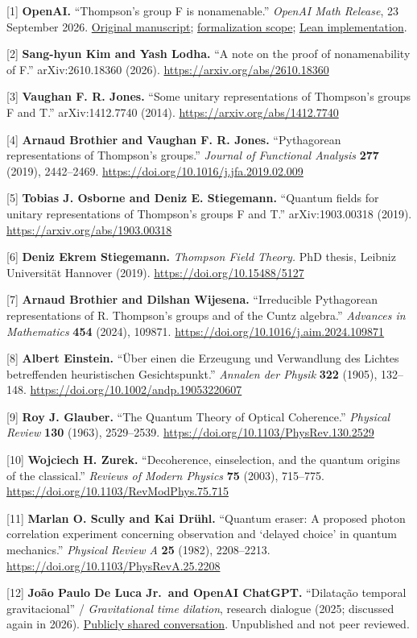 \documentclass[11pt,a4paper]{article}
\begin{document}
{[}1{]} \textbf{OpenAI.} ``Thompson's group F is nonamenable.'' \emph{OpenAI Math Release}, 23 September 2026. \href{https://github.com/openai/math/blob/main/preprints/Thompsons-group-F-is-nonamenable-September-23-2026/paper.pdf}{Original manuscript}; \href{https://github.com/openai/math/blob/main/lean/docs/248.md}{formalization scope}; \href{https://github.com/openai/math/blob/main/lean/OAI/GroupTheory/Thompson/Main.lean}{Lean implementation}.

{[}2{]} \textbf{Sang-hyun Kim and Yash Lodha.} ``A note on the proof of nonamenability of F.'' arXiv:2610.18360 (2026). \url{https://arxiv.org/abs/2610.18360}

{[}3{]} \textbf{Vaughan F. R. Jones.} ``Some unitary representations of Thompson's groups F and T.'' arXiv:1412.7740 (2014). \url{https://arxiv.org/abs/1412.7740}

{[}4{]} \textbf{Arnaud Brothier and Vaughan F. R. Jones.} ``Pythagorean representations of Thompson's groups.'' \emph{Journal of Functional Analysis} \textbf{277} (2019), 2442--2469. \url{https://doi.org/10.1016/j.jfa.2019.02.009}

{[}5{]} \textbf{Tobias J. Osborne and Deniz E. Stiegemann.} ``Quantum fields for unitary representations of Thompson's groups F and T.'' arXiv:1903.00318 (2019). \url{https://arxiv.org/abs/1903.00318}

{[}6{]} \textbf{Deniz Ekrem Stiegemann.} \emph{Thompson Field Theory.} PhD thesis, Leibniz Universität Hannover (2019). \url{https://doi.org/10.15488/5127}

{[}7{]} \textbf{Arnaud Brothier and Dilshan Wijesena.} ``Irreducible Pythagorean representations of R. Thompson's groups and of the Cuntz algebra.'' \emph{Advances in Mathematics} \textbf{454} (2024), 109871. \url{https://doi.org/10.1016/j.aim.2024.109871}

{[}8{]} \textbf{Albert Einstein.} ``Über einen die Erzeugung und Verwandlung des Lichtes betreffenden heuristischen Gesichtspunkt.'' \emph{Annalen der Physik} \textbf{322} (1905), 132--148. \url{https://doi.org/10.1002/andp.19053220607}

{[}9{]} \textbf{Roy J. Glauber.} ``The Quantum Theory of Optical Coherence.'' \emph{Physical Review} \textbf{130} (1963), 2529--2539. \url{https://doi.org/10.1103/PhysRev.130.2529}

{[}10{]} \textbf{Wojciech H. Zurek.} ``Decoherence, einselection, and the quantum origins of the classical.'' \emph{Reviews of Modern Physics} \textbf{75} (2003), 715--775. \url{https://doi.org/10.1103/RevModPhys.75.715}

{[}11{]} \textbf{Marlan O. Scully and Kai Drühl.} ``Quantum eraser: A proposed photon correlation experiment concerning observation and `delayed choice' in quantum mechanics.'' \emph{Physical Review A} \textbf{25} (1982), 2208--2213. \url{https://doi.org/10.1103/PhysRevA.25.2208}

{[}12{]} \textbf{João Paulo De Luca Jr.~and OpenAI ChatGPT.} ``Dilatação temporal gravitacional'' / \emph{Gravitational time dilation}, research dialogue (2025; discussed again in 2026). \href{https://chatgpt.com/share/6af0429d-20f8-83e9-8009-0c52d42af26d}{Publicly shared conversation}. Unpublished and not peer reviewed.
\end{document}
